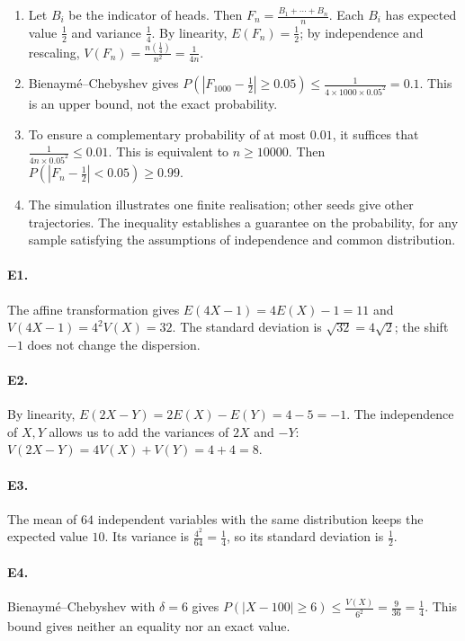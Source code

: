 \begin{enumerate}
\item Let $B_i$ be the indicator of heads. Then $F_n=\frac{B_1+\cdots+B_n}{n}$. Each $B_i$ has expected value $\frac{1}{2}$ and variance $\frac{1}{4}$. By linearity, $E(F_n)=\frac{1}{2}$; by independence and rescaling, $V(F_n)=\frac{n(\frac{1}{4})}{n^2}=\frac{1}{4n}$.
\item Bienaymé--Chebyshev gives $P(|F_{1000}-\frac{1}{2}|\ge\num{0,05})\le\frac{1}{4\times1000\times\num{0,05}^2}=\num{0,1}$. This is an upper bound, not the exact probability.
\item To ensure a complementary probability of at most $\num{0,01}$, it suffices that $\frac{1}{4n\times\num{0,05}^2}\le\num{0,01}$. This is equivalent to $n\ge10000$. Then $P(|F_n-\frac{1}{2}|<\num{0,05})\ge\num{0,99}$.
\item The simulation illustrates one finite realisation; other seeds give other trajectories. The inequality establishes a guarantee on the probability, for any sample satisfying the assumptions of independence and common distribution.
\end{enumerate}

\paragraph{E1.}The affine transformation gives $E(4X-1)=4E(X)-1=11$ and $V(4X-1)=4^2V(X)=32$. The standard deviation is $\sqrt{32}=4\sqrt2$; the shift $-1$ does not change the dispersion.

\paragraph{E2.}By linearity, $E(2X-Y)=2E(X)-E(Y)=4-5=-1$. The independence of $X,Y$ allows us to add the variances of $2X$ and $-Y$: $V(2X-Y)=4V(X)+V(Y)=4+4=8$.

\paragraph{E3.}The mean of $64$ independent variables with the same distribution keeps the expected value $10$. Its variance is $\frac{4^2}{64}=\frac{1}{4}$, so its standard deviation is $\frac{1}{2}$.

\paragraph{E4.}Bienaymé--Chebyshev with $\delta=6$ gives $P(|X-100|\ge6)\le \frac{V(X)}{6^2}=\frac{9}{36}=\frac{1}{4}$. This bound gives neither an equality nor an exact value.

